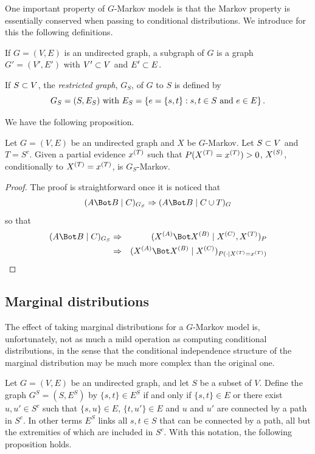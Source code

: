 One important property of $G$-Markov models is that the Markov
property is essentially conserved when passing to conditional
distributions. We introduce for this the following definitions.
\begin{definition}
\label{def:subg}
If $G = (V,E)$ is an undirected graph, a subgraph of $G$ is a graph
$G'=(V',E')$ with $V'\subset V$ and $E'\subset E$.

If $S\subset V$, the {\em restricted graph}, $G_S$, of $G$ to $S$ is defined by
\begin{equation}
\label{eq:rest.grph}
G_S = (S, E_S) \text{ with } E_S = \left\{ e = \{s,t\}: s,t\in S \text {
and } e \in E \right\}.
\end{equation}
\end{definition}

We have the following proposition.
\begin{proposition}
\label{prop:cond.dist.grph}
Let $G = (V,E)$ be an undirected graph and $X$ be $G$-Markov. Let
$S\subset V$ and $T = S^c$. Given a partial evidence $x^{(T)}$ such that
$P(X^{(T)}=x^{(T)})>0$,  $X^{(S)}$, conditionally to $X^{(T)}=x^{(T)}$, is
$G_S$-Markov.
\end{proposition}
\begin{proof}
The proof is straightforward once it is noticed that 
\[
\cind{A}{B}{C}_{G_S} \Ria \cind{A}{B}{C\cup T}_G
\]
so that
\begin{eqnarray*}
\cind{A}{B}{C}_{G_S} &\Ria& \cind{\pe X A}{\pe X B}{\pe X C, \pe X T}_P\\
&\Ria& \cind{\pe X A}{\pe X B}{\pe X C}_{P(\cdot\mid \pe X T=\pe x T)}
\end{eqnarray*}
\end{proof}

\subsection{Marginal distributions}
The effect of taking marginal distributions for a $G$-Markov model is,
unfortunately, not as much a mild operation as computing conditional
distributions, in the sense that the conditional independence structure
of the marginal distribution may be much more complex than the original one.

Let $G = (V, E)$ be an undirected graph, and let $S$ be a subset of
$V$. Define the graph $G^S = (S, E^S)$ by $\{s, t\}\in E^S$ if and
only if $\{s, t\}\in E$ or there exist $u, u'\in S^c$ such that
$\{s,u\} \in E$, $\{t, u'\}\in E$ and $u$ and $u'$ are connected by a
path in $S^c$. In other terms $E^S$ links all $s,t\in S$ that can be
connected by a path, all but the extremities of which are included in
$S^c$.
  With this notation, the
following proposition holds.


